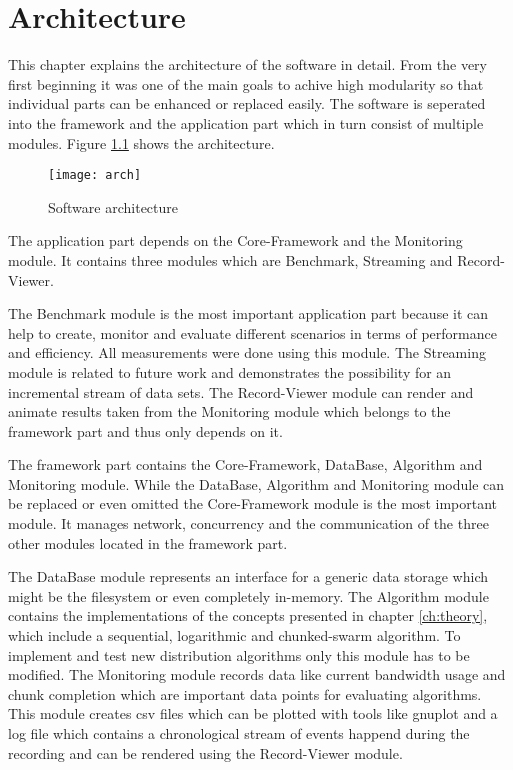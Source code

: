 \chapter{Architecture}
\label{ch:arch}

This chapter explains the architecture of the software in detail. From the very first beginning it was one of the main goals to achive high modularity so that individual parts can be enhanced or replaced easily. The software is seperated into the framework and the application part which in turn consist of multiple modules. Figure \ref{fig:arch} shows the architecture.

\vspace{1cm}

\begin{figure}[H]
\centering
\texttt{[image: arch]}
\caption{Software architecture}
\label{fig:arch}
\end{figure}

\clearpage

The application part depends on the Core-Framework and the Monitoring module. It contains three modules which are Benchmark, Streaming and Record-Viewer. 

The Benchmark module is the most important application part because it can help to create, monitor and evaluate different scenarios in terms of performance and efficiency. All measurements were done using this module. The Streaming module is related to future work and demonstrates the possibility for an incremental stream of data sets. The Record-Viewer module can render and animate results taken from the Monitoring module which belongs to the framework part and thus only depends on it.

The framework part contains the Core-Framework, DataBase, Algorithm and Monitoring module. While the DataBase, Algorithm and Monitoring module can be replaced or even omitted the Core-Framework module is the most important module. It manages network, concurrency and the communication of the three other modules located in the framework part. 

The DataBase module represents an interface for a generic data storage which might be the filesystem or even completely in-memory. The Algorithm module contains the implementations of the concepts presented in chapter \ref{ch:theory}, which include a sequential, logarithmic and chunked-swarm algorithm. To implement and test new distribution algorithms only this module has to be modified. The Monitoring module records data like current bandwidth usage and chunk completion which are important data points for evaluating algorithms. This module creates csv files which can be plotted with tools like gnuplot and a log file which contains a chronological stream of events happend during the recording and can be rendered using the Record-Viewer module.

